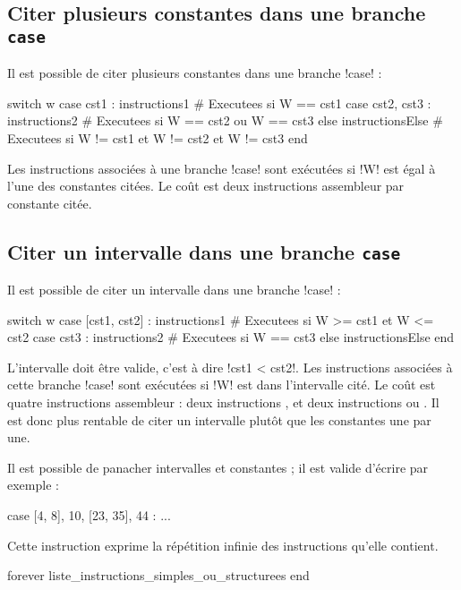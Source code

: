\subsection{Citer plusieurs constantes dans une branche \texttt{case}}

Il est possible de citer plusieurs constantes dans une branche \pic!case! :
\begin{piccolo}
switch w
case cst1 :
  instructions1 # Executees si W == cst1
case cst2, cst3 :
  instructions2 # Executees si W == cst2 ou W == cst3
else
  instructionsElse # Executees si W != cst1 et W != cst2 et W != cst3
end
\end{piccolo}

Les instructions associées à une branche \pic!case! sont exécutées si \pic!W! est égal à l'une des constantes citées. Le coût est deux instructions assembleur par constante citée.


\subsection{Citer un intervalle dans une branche \texttt{case}}

Il est possible de citer un intervalle dans une branche \pic!case! :
\begin{piccolo}
switch w
case [cst1, cst2] :
  instructions1 # Executees si W >= cst1 et W <= cst2
case cst3 :
  instructions2 # Executees si W == cst3
else
  instructionsElse
end
\end{piccolo}

L'intervalle doit être valide, c'est à dire \pic!cst1 < cst2!. Les instructions associées à cette branche \pic!case! sont exécutées si \pic!W! est dans l'intervalle cité. Le coût est quatre instructions assembleur : deux instructions , et deux instructions  ou  . Il est donc plus rentable de citer un intervalle plutôt que les constantes une par une.

Il est possible de panacher intervalles et constantes ; il est valide d'écrire par exemple :
\begin{piccolo}
case [4, 8], 10, [23, 35], 44 : ...
\end{piccolo}








Cette instruction exprime la répétition infinie des instructions qu'elle contient.
\begin{piccolo}
forever
  liste_instructions_simples_ou_structurees
end
\end{piccolo}

